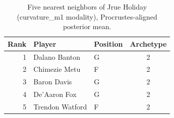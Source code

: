 \begin{table}[htbp]
  \centering\small
  \begin{tabular}{rllc}
    \toprule
    Rank & Player & Position & Archetype \\
    \midrule
    1 & Dalano Banton & G & 2 \\
    2 & Chimezie Metu & F & 2 \\
    3 & Baron Davis & G & 2 \\
    4 & De'Aaron Fox & G & 2 \\
    5 & Trendon Watford & F & 2 \\
    \bottomrule
  \end{tabular}
  \caption{Five nearest neighbors of Jrue Holiday (curvature_m1 modality), Procrustes-aligned posterior mean.}
  \label{tab:Jrue_Holiday_neighbors_curvature_m1}
\end{table}


